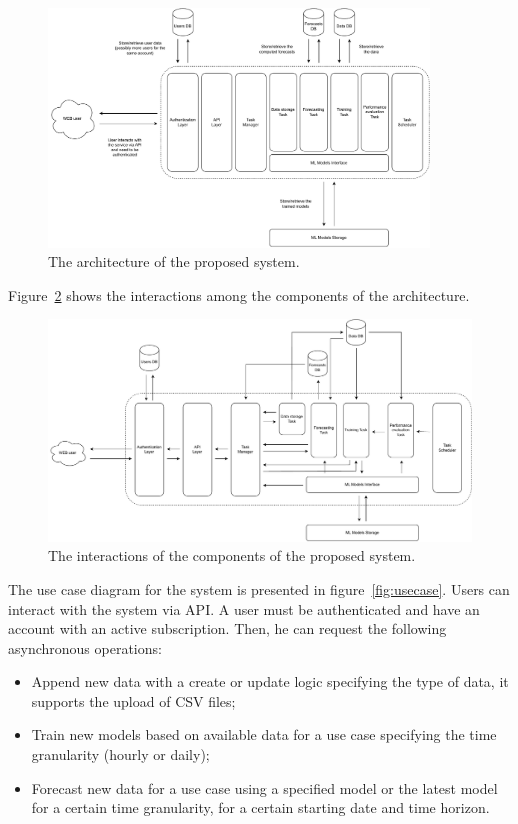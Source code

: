 \begin{figure}[H]
\centering 
\includegraphics[width=0.9\textwidth]{images/architecture_components}
\caption{The architecture of the proposed system.}
\label{fig:components}
\end{figure}

Figure~\ref{fig:interactions} shows the interactions among the components of the architecture.

\begin{figure}[H]
\centering 
\includegraphics[width=1\textwidth]{images/architecture_interactions}
\caption{The interactions of the components of the proposed system.}
\label{fig:interactions}
\end{figure}

The use case diagram for the system is presented in figure~\ref{fig:usecase}.
Users can interact with the system via API.
A user must be authenticated and have an account with an active subscription.
Then, he can request the following asynchronous operations:
\begin{itemize}
  \item Append new data with a create or update logic specifying the type of data, it supports the upload of CSV files;
  \item Train new models based on available data for a use case specifying the time granularity (hourly or daily);
  \item Forecast new data for a use case using a specified model or the latest model for a certain time granularity, for a certain starting date and time horizon.
\end{itemize}

